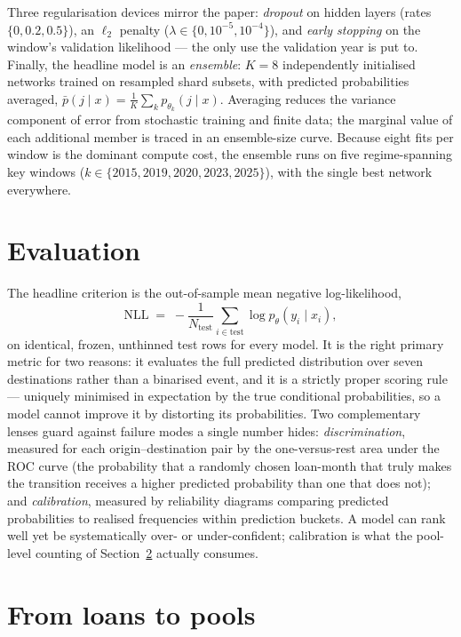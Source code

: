 Three regularisation devices mirror the paper: \emph{dropout}
\citep{dropout} on hidden layers (rates $\{0, 0.2, 0.5\}$), an
$\ell_2$ penalty ($\lambda \in \{0, 10^{-5}, 10^{-4}\}$), and
\emph{early stopping} on the window's validation likelihood --- the
only use the validation year is put to.  Finally, the headline model
is an \emph{ensemble}: $K{=}8$ independently initialised networks
trained on resampled shard subsets, with predicted probabilities
averaged, $\bar p(j\mid x) = \tfrac1K \sum_k p_{\theta_k}(j \mid x)$.
Averaging reduces the variance component of error from stochastic
training and finite data; the marginal value of each additional
member is traced in an ensemble-size curve.  Because eight fits per
window is the dominant compute cost, the ensemble runs on five
regime-spanning key windows ($k\in\{2015, 2019, 2020, 2023, 2025\}$),
with the single best network everywhere.

\section{Evaluation}
\label{sec:meth-eval}

The headline criterion is the out-of-sample mean negative
log-likelihood,
\begin{equation}
\label{eq:nll}
\mathrm{NLL} \;=\; -\frac{1}{N_{\mathrm{test}}}
\sum_{i\in\mathrm{test}} \log p_\theta\!\left(y_i \mid x_i\right),
\end{equation}
on identical, frozen, unthinned test rows for every model.  It is the
right primary metric for two reasons: it evaluates the full predicted
distribution over seven destinations rather than a binarised event,
and it is a strictly proper scoring rule --- uniquely minimised in
expectation by the true conditional probabilities, so a model cannot
improve it by distorting its probabilities.  Two complementary lenses
guard against failure modes a single number hides:
\emph{discrimination}, measured for each origin--destination pair by
the one-versus-rest area under the ROC curve (the probability that a
randomly chosen loan-month that truly makes the transition receives a
higher predicted probability than one that does not); and
\emph{calibration}, measured by reliability diagrams comparing
predicted probabilities to realised frequencies within prediction
buckets.  A model can rank well yet be systematically over- or
under-confident; calibration is what the pool-level counting of
Section~\ref{sec:meth-pool} actually consumes.

\section{From loans to pools}
\label{sec:meth-pool}

